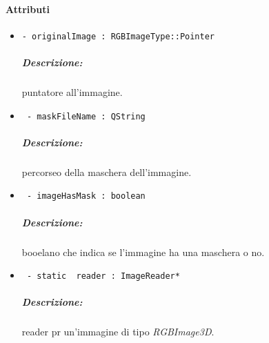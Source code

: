 \paragraph{Attributi}
	\begin{itemize}
		\item \color{teal}\verb!- originalImage : RGBImageType::Pointer !\\
		\color{black}
		\subparagraph{Descrizione:} puntatore all'immagine.
		
		
		
		\item \color{teal}\verb! - maskFileName : QString!\\
		\color{black}
		\subparagraph{Descrizione:} percorseo della maschera\g{} dell'immagine.
		
		\item \color{teal}\verb! - imageHasMask : boolean!\\
		\color{black}
		\subparagraph{Descrizione:} booelano che indica se l'immagine ha una maschera o no.
		
		\item \color{teal}\verb! - static  reader : ImageReader*!
		\color{black}
		\subparagraph{Descrizione:} reader pr un'immagine di tipo \textsl{RGBImage3D}.
		

	\end{itemize}

\color{black}
